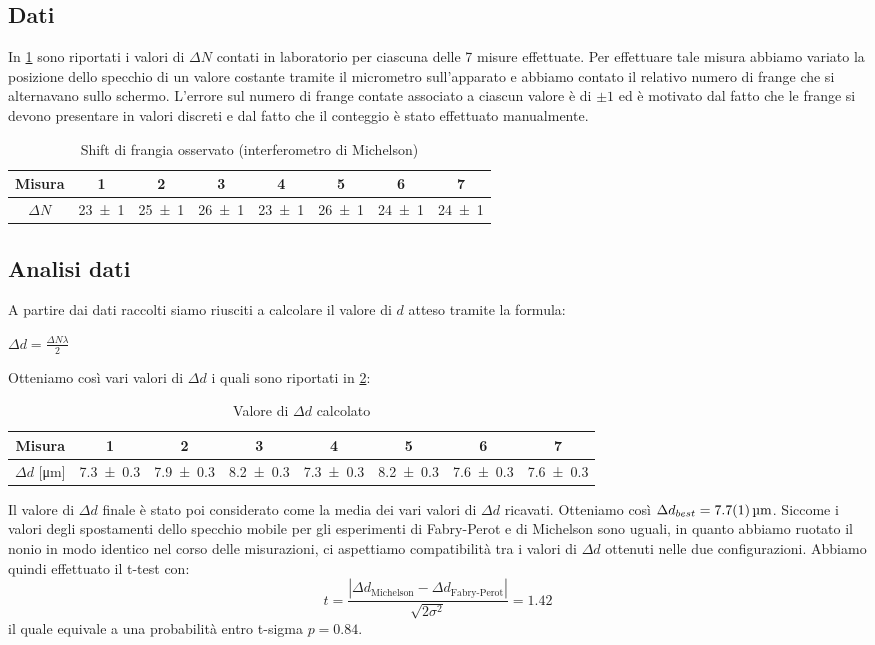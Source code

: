 \documentclass[a4paper]{article}
\begin{document}
\subsection{Dati}
In \cref{tab:micrometro-michelson} sono riportati i valori di $\Delta N$ contati in laboratorio per ciascuna delle 7 misure effettuate. Per effettuare tale misura abbiamo variato la posizione dello specchio di un valore costante tramite il micrometro sull'apparato e abbiamo contato il relativo numero di frange che si alternavano sullo schermo. L'errore sul numero di frange contate associato a ciascun valore è di $\pm1$ ed è motivato dal fatto che le frange si devono presentare in valori discreti e dal fatto che il conteggio è stato effettuato manualmente. 
\begin{table}[htbp]
\centering
\caption{Shift di frangia osservato (interferometro di Michelson)}
\begin{tabular}{cccccccc}
\toprule
Misura & 1 & 2 & 3 & 4 & 5 & 6 & 7 \\
\midrule
$\Delta N$ & \num{23 \pm 1} & \num{25 \pm 1} & \num{26 \pm 1} & \num{23 \pm 1} & \num{26 \pm 1} & \num{24 \pm 1} & \num{24 \pm 1} \\
\bottomrule
\end{tabular}
\label{tab:micrometro-michelson}
\end{table}
\subsection{Analisi dati}
A partire dai dati raccolti siamo riusciti a calcolare il valore di $d$ atteso tramite la formula: 
\begin{center}
    $\Delta d=\frac{\Delta N \lambda}{2}$
\end{center}
Otteniamo così vari valori di $\Delta d$ i quali sono riportati in \cref{tab:valori-d-michelson}:
\begin{table}[htbp]
\centering
\caption{Valore di $\Delta d$ calcolato}
\begin{tabular}{cccccccc}
\toprule
Misura & 1 & 2 & 3 & 4 & 5 & 6 & 7 \\
\midrule
$\Delta d$ [\si{\micro\meter}] & \num{7.3 \pm 0.3} & \num{7.9 \pm 0.3} & \num{8.2 \pm 0.3} & \num{7.3 \pm 0.3} & \num{8.2 \pm 0.3} & \num{7.6 \pm 0.3} & \num{7.6 \pm 0.3} \\
\bottomrule
\end{tabular}
\label{tab:valori-d-michelson}
\end{table} 
Il valore di $\Delta d$ finale è stato poi considerato come la media dei vari valori di $\Delta d$ ricavati. Otteniamo così $\Delta d_{best}=\SI{7.7 \pm 0.1}{\micro\meter}$.
Siccome i valori degli spostamenti dello specchio mobile per gli esperimenti di Fabry-Perot e di Michelson sono uguali, in quanto abbiamo ruotato il nonio in modo identico nel corso delle misurazioni, ci aspettiamo compatibilità tra i valori di $\Delta d$ ottenuti nelle due configurazioni. Abbiamo quindi effettuato il t-test con:
\begin{equation}
    t = \frac{|\Delta d_{\text{Michelson}} - \Delta d_{\text{Fabry-Perot}}|}{\sqrt{2\sigma^2}} = \num{1.42}
\end{equation}
il quale equivale a una probabilità entro t-sigma $p = \num{0.84}$.
\end{document}
